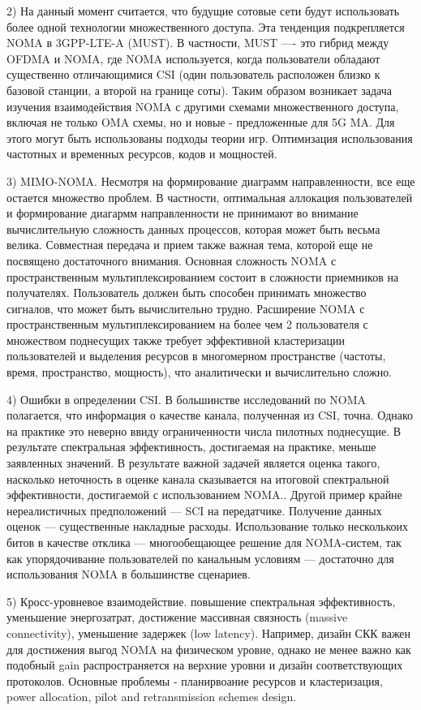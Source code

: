 \documentclass{book}
\numberwithin{theorem}{chapter}
\numberwithin{statement}{chapter}
\numberwithin{lemma}{chapter}
\theoremstyle{definition}
\numberwithin{task}{chapter}
\theoremstyle{remark}
\numberwithin{example}{chapter}
\theoremstyle{definition}
\numberwithin{definition}{chapter}
\theoremstyle{remark}
\theoremstyle{remark}
\numberwithin{lyrics}{section}
\begin{document}
	2) На данный момент считается, что будущие сотовые сети будут использовать более одной технологии множественного доступа. Эта тенденция подкрепляется NOMA в 3GPP-LTE-A (MUST). В частности, MUST ---- это гибрид между OFDMA и NOMA, где NOMA используется, когда пользователи обладают существенно отличающимися CSI (один пользователь расположен близко к базовой станции, а второй на границе соты). Таким образом возникает задача изучения взаимодействия NOMA с другими схемами множественного доступа, включая не только OMA схемы, но и новые - предложенные для 5G MA. Для этого могут быть использованы подходы теории игр. Оптимизация использования частотных и временных ресурсов, кодов и мощностей.
	
	3) MIMO-NOMA. Несмотря на формирование диаграмм направленности, все еще остается множество проблем. В частности, оптимальная аллокация пользователей и формирование диагармм направленности не принимают во внимание вычислительную сложность данных процессов, которая может быть весьма велика. Совместная передача и прием также важная тема, которой еще не посвящено достаточного внимания. Основная сложность NOMA с пространственным мультиплексированием состоит в сложности приемников на получателях. Пользователь должен быть способен принимать множество сигналов, что может быть вычислительно трудно. Расширение NOMA с пространственным мультиплексированием на более чем 2 пользователя с множеством поднесущих также требует эффективной кластеризации пользователей и выделения ресурсов в многомерном пространстве (частоты, время, пространство, мощность), что аналитически и вычислительно сложно.
	
	4) Ошибки в определении CSI. В большинстве исследований по NOMA полагается, что информация о качестве канала, полученная из CSI, точна. Однако на практике это неверно ввиду ограниченности числа пилотных поднесущие. В результате спектральная эффективность, достигаемая на практике, меньше заявленных значений. В результате важной задачей является оценка такого, насколько неточность в оценке канала сказывается на итоговой спектральной эффективности, достигаемой с использованием NOMA.. Другой пример крайне нереалистичных предположений --- SCI на передатчике. Получение данных оценок --- существенные накладные расходы. Использование только несколькоих битов в качестве отклика --- многообещающее решение для NOMA-систем, так как упорядочивание пользователей по канальным условиям --- достаточно для использования NOMA в большинстве сценариев.
	
	5) Кросс-уровневое взаимодействие. повышение спектральная эффективность, уменьшение энергозатрат, достижение массивная связность (massive connectivity), уменьшение задержек (low latency). Например, дизайн СКК важен для достижения выгод NOMA на физическом уровне, однако не менее важно как подобный gain распространяется на верхние уровни и дизайн соответствующих протоколов. Основные проблемы - планирвоание ресурсов и кластеризация, power allocation, pilot and retransmission schemes design.
	
\end{document}
